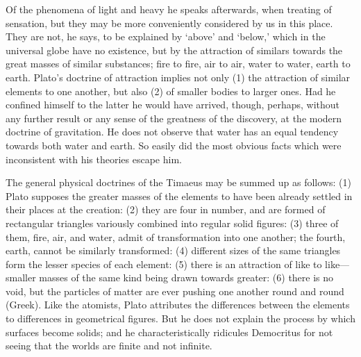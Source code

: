 \documentclass[11pt,letter]{article}
\begin{document}
\par  Of the phenomena of light and heavy he speaks afterwards, when treating of sensation, but they may be more conveniently considered by us in this place. They are not, he says, to be explained by ‘above’ and ‘below,’ which in the universal globe have no existence, but by the attraction of similars towards the great masses of similar substances; fire to fire, air to air, water to water, earth to earth. Plato’s doctrine of attraction implies not only (1) the attraction of similar elements to one another, but also (2) of smaller bodies to larger ones. Had he confined himself to the latter he would have arrived, though, perhaps, without any further result or any sense of the greatness of the discovery, at the modern doctrine of gravitation. He does not observe that water has an equal tendency towards both water and earth. So easily did the most obvious facts which were inconsistent with his theories escape him.

\par  The general physical doctrines of the Timaeus may be summed up as follows: (1) Plato supposes the greater masses of the elements to have been already settled in their places at the creation: (2) they are four in number, and are formed of rectangular triangles variously combined into regular solid figures: (3) three of them, fire, air, and water, admit of transformation into one another; the fourth, earth, cannot be similarly transformed: (4) different sizes of the same triangles form the lesser species of each element: (5) there is an attraction of like to like—smaller masses of the same kind being drawn towards greater: (6) there is no void, but the particles of matter are ever pushing one another round and round (Greek). Like the atomists, Plato attributes the differences between the elements to differences in geometrical figures. But he does not explain the process by which surfaces become solids; and he characteristically ridicules Democritus for not seeing that the worlds are finite and not infinite.

\par 
\end{document}
